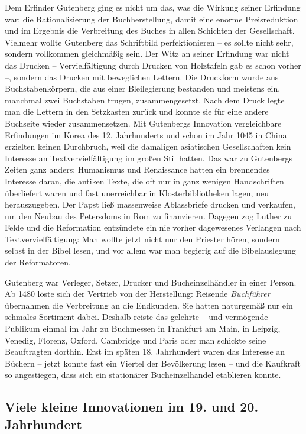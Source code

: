 \documentclass[a4paper,
fontsize=11pt,
oneside,
numbers=noperiodatend,
parskip=half-,
bibliography=totoc,
final
]{scrartcl}
\begin{document}
Dem Erfinder Gutenberg ging es nicht um das, was die Wirkung seiner
Erfindung war: die Rationalisierung der Buchherstellung, damit eine
enorme Preisreduktion und im Ergebnis die Verbreitung des Buches in
allen Schichten der Gesellschaft. Vielmehr wollte Gutenberg das
Schriftbild perfektionieren -- es sollte nicht sehr, sondern vollkommen
gleichmäßig sein. Der Witz an seiner Erfindung war nicht das Drucken --
Vervielfältigung durch Drucken von Holztafeln gab es schon vorher --,
sondern das Drucken mit beweglichen Lettern. Die Druckform wurde aus
Buchstabenkörpern, die aus einer Bleilegierung bestanden und meistens
ein, manchmal zwei Buchstaben trugen, zusammengesetzt. Nach dem Druck
legte man die Lettern in den Setzkasten zurück und konnte sie für eine
andere Buchseite wieder zusammensetzen. Mit Gutenbergs Innovation
vergleichbare Erfindungen im Korea des 12. Jahrhunderts und schon im
Jahr 1045 in China erzielten keinen Durchbruch, weil die damaligen
asiatischen Gesellschaften kein Interesse an Textvervielfältigung im
großen Stil hatten. Das war zu Gutenbergs Zeiten ganz anders: Humanismus
und Renaissance hatten ein brennendes Interesse daran, die antiken
Texte, die oft nur in ganz wenigen Handschriften überliefert waren und
fast unerreichbar in Klosterbibliotheken lagen, neu herauszugeben. Der
Papst ließ massenweise Ablassbriefe drucken und verkaufen, um den Neubau
des Petersdoms in Rom zu finanzieren. Dagegen zog Luther zu Felde und
die Reformation entzündete ein nie vorher dagewesenes Verlangen nach
Textvervielfältigung: Man wollte jetzt nicht nur den Priester hören,
sondern selbst in der Bibel lesen, und vor allem war man begierig auf
die Bibelauslegung der Reformatoren.

Gutenberg war Verleger, Setzer, Drucker und Bucheinzelhändler in einer
Person. Ab 1480 löste sich der Vertrieb von der Herstellung: Reisende
\emph{Buchführer} übernahmen die Verbreitung an die Endkunden. Sie
hatten naturgemäß nur ein schmales Sortiment dabei. Deshalb reiste das
gelehrte -- und vermögende -- Publikum einmal im Jahr zu Buchmessen in
Frankfurt am Main, in Leipzig, Venedig, Florenz, Oxford, Cambridge und
Paris oder man schickte seine Beauftragten dorthin. Erst im späten 18.
Jahrhundert waren das Interesse an Büchern -- jetzt konnte fast ein
Viertel der Bevölkerung lesen -- und die Kaufkraft so angestiegen, dass
sich ein stationärer Bucheinzelhandel etablieren konnte.

\hypertarget{viele-kleine-innovationen-im-19.-und-20.-jahrhundert}{%
\subsection{Viele kleine Innovationen im 19. und 20.
Jahrhundert}\label{viele-kleine-innovationen-im-19.-und-20.-jahrhundert}}
\end{document}
